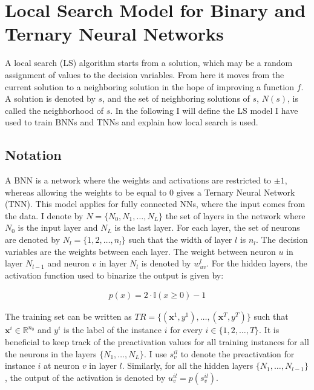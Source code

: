 \section{Local Search Model for Binary and Ternary Neural Networks}

A local search (LS) algorithm starts from a solution, which may be a random assignment of values to the decision variables. From here it moves from the current solution to a neighboring solution in the hope of improving a function $f$. A solution is denoted by $s$, and the set of neighboring solutions of $s$, $N(s)$, is called the neighborhood of $s$. In the following I will define the LS model I have used to train BNNs and TNNs and explain how local search is used. 

\subsection{Notation}
A BNN is a network where the weights and activations are restricted to $\pm 1$, whereas allowing the weights to be equal to 0 gives a Ternary Neural Network (TNN). This model applies for fully connected NNs, where the input comes from the data. I denote by $N = \{N_0, N_1, \ldots, N_L\}$ the set of layers in the network where $N_0$ is the input layer and $N_L$ is the last layer. For each layer, the set of neurons are denoted by $N_l = \{1, 2, \ldots, n_l\}$ such that the width of layer $l$ is $n_l$. The decision variables are the weights between each layer. The weight between neuron $u$ in layer $N_{l-1}$ and neuron $v$ in layer $N_l$ is denoted by $w_{uv}^l$. For the hidden layers, the activation function used to binarize the output is given by: 

\begin{align}
    \label{act} p(x) = 2 \cdot \mathbb{I} (x \geq 0) - 1
\end{align}

\noindent The training set can be written as $TR = \{ (\mathbf{x}^1, y^1), \ldots , (\mathbf{x}^T, y^T) \}$ such that $\mathbf{x}^i \in \mathbb{R}^{n_0}$ and $y^i$ is the label of the instance $i$ for every $i\in \{1, 2, \ldots, T\}$. It is beneficial to keep track of the preactivation values for all training instances for all the neurons in the layers $\{N_1, \ldots, N_L\}$. I use $s_v^{il}$ to denote the preactivation for instance $i$ at neuron $v$ in layer $l$. Similarly, for all the hidden layers $\{N_1, \ldots, N_{l-1}\}$, the output of the activation is denoted by $u_v^{il} = p(s_v ^{il})$. 

